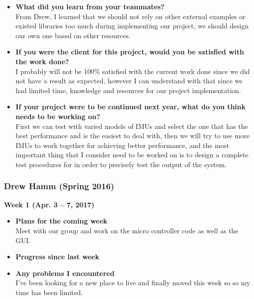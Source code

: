 \begin{itemize}
		\item \textbf{What did you learn from your teammates?}
		\\From Drew, I learned that we should not rely on other external examples or existed libraries too much during implementing our project, we should design our own one based on other resources.\\

		\item \textbf{If you were the client for this project, would you be satisfied with the work done?}
		\\ I probably will not be 100\% satisfied with the current work done since we did not have a result as expected, however I can understand with that since we had limited time, knowledge and resources for our project implementation.\\

		\item \textbf{If your project were to be continued next year, what do you think needs to be working on?}
		\\First we can test with varied models of IMUs and select the one that has the best performance and is the easiest to deal with, then we will try to use more IMUs to work together for achieving better performance, and the most important thing that I consider need to be worked on is to design a complete test procedures for in order to precisely test the output of the system.\\
	\end{itemize}


\newpage
	\subsubsection{Drew Hamm (Spring 2016)}
	\vspace{0.5cm}

	\begin{center}
		\textbf{Week 1 (Apr. 3 {\textasciitilde{}} 7, 2017)}
	\end{center}
	\begin{itemize}
		\item \textbf{Plans for the coming week}
		\\Meet with our group and work on the micro controller code as well as the GUI.\\

		\item \textbf{Progress since last week}

		\item \textbf{Any problems I encountered}
		\\ I've been looking for a new place to live and finally moved this week so so my time has been limited.\\
	\end{itemize}

